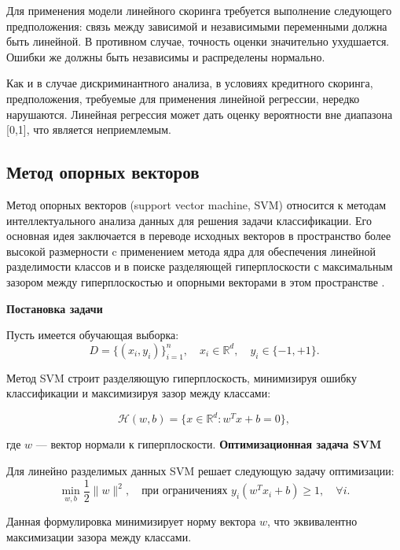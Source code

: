 Для применения модели линейного скоринга требуется выполнение следующего предположения: связь между зависимой и независимыми переменными должна быть линейной. В противном случае, точность оценки значительно ухудшается. Ошибки же должны быть независимы и распределены нормально.

Как и в случае дискриминантного анализа, в условиях кредитного скоринга, предположения, требуемые для применения линейной регрессии, нередко нарушаются. Линейная регрессия может дать оценку вероятности вне диапазона [0,1], что является неприемлемым.


\subsection{Метод опорных векторов}

Метод опорных векторов (support vector machine, SVM) относится к методам интеллектуального анализа данных для решения задачи классификации. Его основная идея заключается в переводе исходных векторов в пространство более высокой размерности c применением метода ядра для обеспечения линейной разделимости классов и в поиске разделяющей гиперплоскости с максимальным зазором между гиперплоскостью и опорными векторами в этом пространстве \cite{Mihailov}.

\textbf{Постановка задачи}

Пусть имеется обучающая выборка:
\begin{equation}
  D = \{(x_i, y_i)\}_{i=1}^{n}, \quad x_i \in \mathbb{R}^{d}, \quad y_i \in \{-1, +1\}.
\end{equation}

Метод SVM строит разделяющую гиперплоскость, минимизируя ошибку классификации и максимизируя зазор между классами:

\begin{equation}
  \mathcal{H}(w, b) = \{x \in \mathbb{R}^{d} : w^T x + b = 0\},
\end{equation}

где $w$ --- вектор нормали к гиперплоскости.
\newpage
\textbf{Оптимизационная задача SVM}

Для линейно разделимых данных SVM решает следующую задачу оптимизации:
\begin{equation}
  \min_{w, b} \frac{1}{2} \|w\|^2,
  \quad \text{при ограничениях } y_i (w^T x_i + b) \geqslant 1, \quad \forall i.
\end{equation}

Данная формулировка минимизирует норму вектора $w$, что эквивалентно максимизации зазора между классами.

